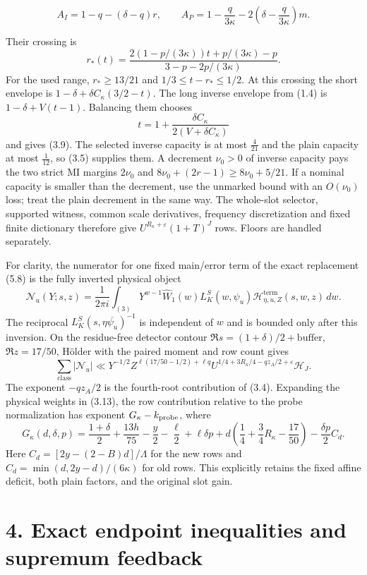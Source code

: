 \documentclass[11pt,a4paper]{article}
\begin{document}
\[
A_I=1-q-(\delta-q)r,\qquad
A_P=1-\frac q{3\kappa}
      -2\left(\delta-\frac q{3\kappa}\right)m.
\tag{3.10}
\]

Their crossing is \[
r_*(t)=
\frac{2(1-p/(3\kappa))t+p/(3\kappa)-p}
 {3-p-2p/(3\kappa)}.
\tag{3.11}
\] For the used range, \(r_*\ge13/21\) and \(1/3\le t-r_*\le1/2\). At
this crossing the short envelope is \(1-\delta+\delta C_\kappa(3/2-t)\).
The long inverse envelope from (1.4) is \(1-\delta+V(t-1)\). Balancing
them chooses \[
t=1+\frac{\delta C_\kappa}{2(V+\delta C_\kappa)}
\] and gives (3.9). The selected inverse capacity is at most \(\frac{4}{21}\)
and the plain capacity at most \(\frac{1}{12}\), so (3.5) supplies them. A
decrement \(\nu_0>0\) of inverse capacity pays the two strict MI margins
\(2\nu_0\) and \(8\nu_0+(2r-1)\ge8\nu_0+5/21\). If a nominal capacity is
smaller than the decrement, use the unmarked bound with an \(O(\nu_0)\)
loss; treat the plain decrement in the same way. The whole-slot
selector, supported witness, common scale derivatives, frequency
discretization and fixed finite dictionary therefore give
\(U^{R_\kappa+\varepsilon}(1+T)^J\) rows. Floors are handled separately.

For clarity, the numerator for one fixed main/error term of the exact
replacement (5.8) is the fully inverted physical object \[
\mathcal N_u(Y;s,z)=\frac1{2\pi i}\int_{(3)}
 Y^{w-1}\widehat W_1(w)L_K^S(w,\psi_u)
 \mathcal H^{\mathrm{term}}_{\eta,u,Z}(s,w,z)\,dw.
\tag{3.12}
\] The reciprocal \(L_K^S(s,\eta\overline{\psi_u})^{-1}\) is independent
of \(w\) and is bounded only after this inversion. On the residue-free
detector contour \(\Re s=(1+\delta)/2+\text{buffer}\), \(\Re z=17/50\),
Hölder with the paired moment and row count gives \[
\sum_{\text{class}}|\mathcal N_u|
\ll Y^{-1/2}Z^{\ell(17/50-1/2)+\ell q}
 U^{1/4+3R_\kappa/4-qz_A/2+\varepsilon}\mathcal H_J.
\tag{3.13}
\] The exponent \(-qz_A/2\) is the fourth-root contribution of (3.4).
Expanding the physical weights in (3.13), the row contribution relative
to the probe normalization has exponent \(G_\kappa-k_{\rm probe}\),
where \[
G_\kappa(d,\delta,p)=\frac{1+\delta}{2}
 +\frac{13h}{75}-\frac y2-\frac\ell2+\ell\delta p
 +d\left(\frac14+\frac34R_\kappa-\frac{17}{50}\right)
 -\frac{\delta p}{2}C_d.
\tag{3.14}
\] Here \(C_d=[2y-(2-B)d]/\Lambda\) for the new rows and
\(C_d=\min(d,2y-d)/(6\kappa)\) for old rows. This explicitly retains the
fixed affine deficit, both plain factors, and the original slot gain.

\hypertarget{exact-endpoint-inequalities-and-supremum-feedback}{%
\section{4. Exact endpoint inequalities and supremum
feedback}\label{exact-endpoint-inequalities-and-supremum-feedback}}
\end{document}
